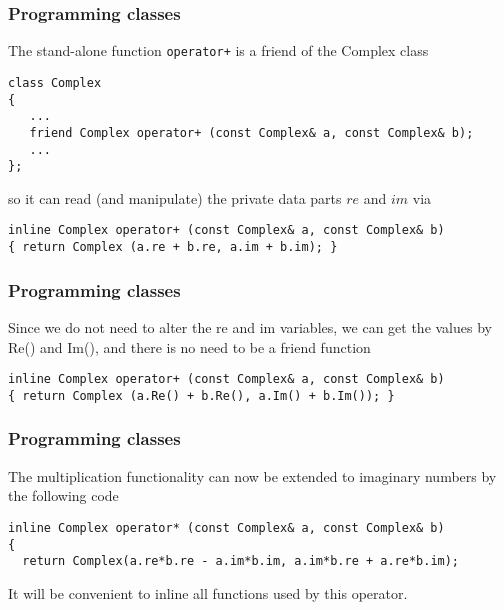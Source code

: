 \documentclass{beamer}
\begin{document}
\begin{frame}
\frametitle{Programming classes}

The stand-alone function \Verb!operator+! is a friend of the Complex  class

\begin{verbatim}
class Complex
{
   ...
   friend Complex operator+ (const Complex& a, const Complex& b);
   ...
};
\end{verbatim}
so it can read (and manipulate) the private data parts $re$ and
$im$ via

\begin{verbatim}
inline Complex operator+ (const Complex& a, const Complex& b)
{ return Complex (a.re + b.re, a.im + b.im); }
\end{verbatim}
\end{frame}

\begin{frame}
\frametitle{Programming classes}

Since we do not need to alter the re and im variables, we can
get the values by Re() and Im(), and there is no need to be a
friend function

\begin{verbatim}
inline Complex operator+ (const Complex& a, const Complex& b)
{ return Complex (a.Re() + b.Re(), a.Im() + b.Im()); }
\end{verbatim}
\end{frame}

\begin{frame}
\frametitle{Programming classes}

The multiplication functionality can now be extended to imaginary numbers by the following code

\begin{verbatim}
inline Complex operator* (const Complex& a, const Complex& b)
{
  return Complex(a.re*b.re - a.im*b.im, a.im*b.re + a.re*b.im);

\end{verbatim}
It will be convenient to inline all functions used by this operator.
\end{frame}
\end{document}
